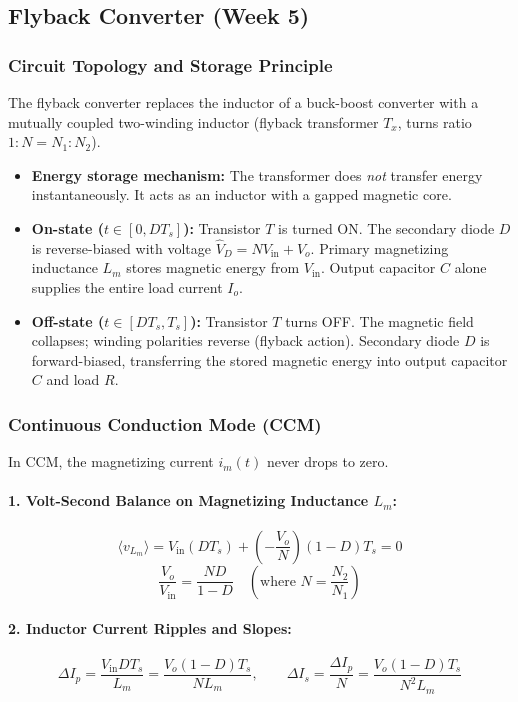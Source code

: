 \subsection{Flyback Converter (Week 5)}

\subsubsection{Circuit Topology and Storage Principle}
The flyback converter replaces the inductor of a buck-boost converter with a mutually coupled two-winding inductor (flyback transformer $T_x$, turns ratio $1:N = N_1:N_2$).
\begin{itemize}
  \item \textbf{Energy storage mechanism:} The transformer does \emph{not} transfer energy instantaneously. It acts as an inductor with a gapped magnetic core.
  \item \textbf{On-state ($t \in [0, D T_s]$):} Transistor $T$ is turned ON. The secondary diode $D$ is reverse-biased with voltage $\hat{V}_D = N V_{\mathrm{in}} + V_o$. Primary magnetizing inductance $L_m$ stores magnetic energy from $V_{\mathrm{in}}$. Output capacitor $C$ alone supplies the entire load current $I_o$.
  \item \textbf{Off-state ($t \in [D T_s, T_s]$):} Transistor $T$ turns OFF. The magnetic field collapses; winding polarities reverse (flyback action). Secondary diode $D$ is forward-biased, transferring the stored magnetic energy into output capacitor $C$ and load $R$.
\end{itemize}

\subsubsection{Continuous Conduction Mode (CCM)}
In CCM, the magnetizing current $i_m(t)$ never drops to zero.

\paragraph{1. Volt-Second Balance on Magnetizing Inductance $L_m$:}
\[
\langle v_{L_m} \rangle = V_{\mathrm{in}} (D T_s) + \left(-\frac{V_o}{N}\right) (1-D) T_s = 0
\]
\begin{equation}
\frac{V_o}{V_{\mathrm{in}}} = \frac{N D}{1 - D} \quad \left(\text{where } N = \frac{N_2}{N_1}\right)
\end{equation}

\paragraph{2. Inductor Current Ripples and Slopes:}
\begin{equation}
\Delta I_p = \frac{V_{\mathrm{in}} D T_s}{L_m} = \frac{V_o (1-D) T_s}{N L_m}, \qquad \Delta I_s = \frac{\Delta I_p}{N} = \frac{V_o (1-D) T_s}{N^2 L_m}
\end{equation}

